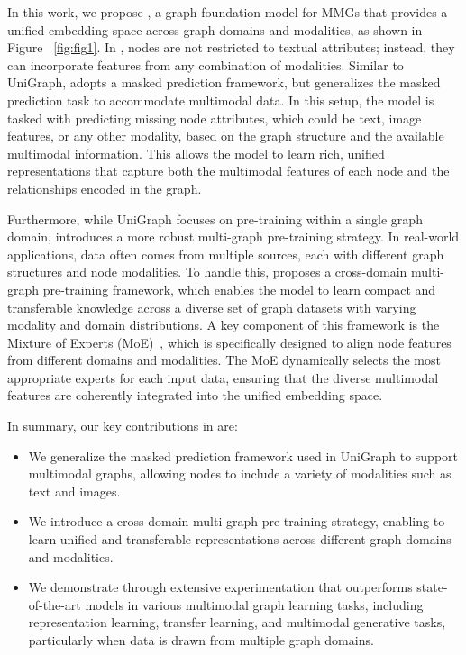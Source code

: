 In this work, we propose \model, a graph foundation model for MMGs that provides a unified embedding space across graph domains and modalities, as shown in Figure ~\ref{fig:fig1}.
In \model, nodes are not restricted to textual attributes; instead, they can incorporate features from any combination of modalities. 
Similar to UniGraph, \model adopts a masked prediction framework, but generalizes the masked prediction task to accommodate multimodal data. In this setup, the model is tasked with predicting missing node attributes, which could be text, image features, or any other modality, based on the graph structure and the available multimodal information. 
This allows the model to learn rich, unified representations that capture both the multimodal features of each node and the relationships encoded in the graph.

Furthermore, while UniGraph focuses on pre-training within a single graph domain, \model introduces a more robust multi-graph pre-training strategy. In real-world applications, data often comes from multiple sources, each with different graph structures and node modalities. To handle this, \model proposes a cross-domain multi-graph pre-training framework, which enables the model to learn compact and transferable knowledge across a diverse set of graph datasets with varying modality and domain distributions. 
A key component of this framework is the Mixture of Experts (MoE)~\cite{shazeer2017outrageously,hou2024graphalign}, which is specifically designed to align node features from different domains and modalities. The MoE dynamically selects the most appropriate experts for each input data, ensuring that the diverse multimodal features are coherently integrated into the unified embedding space.

In summary, our key contributions in \model are:
\begin{itemize}
    \item We generalize the masked prediction framework used in UniGraph to support multimodal graphs, allowing nodes to include a variety of modalities such as text and images.
    \item We introduce a cross-domain multi-graph pre-training strategy, enabling \model to learn unified and transferable representations across different graph domains and modalities.
    \item We demonstrate through extensive experimentation that \model outperforms state-of-the-art models in various multimodal graph learning tasks, including representation learning, transfer learning, and multimodal generative tasks, particularly when data is drawn from multiple graph domains.
\end{itemize}